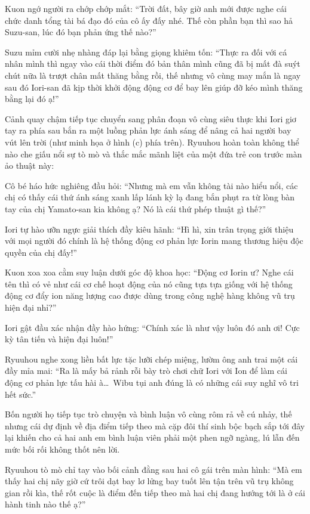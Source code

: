 \documentclass[../main.tex]{subfiles}
\begin{document}
Kuon ngớ người ra chớp chớp mắt: ``Trời đất, bây giờ anh mới được nghe cái chức danh tổng tài bá đạo đó của cô ấy đấy nhé. Thế còn phần bạn thì sao hả Suzu-san, lúc đó bạn phản ứng thế nào?''

Suzu mỉm cười nhẹ nhàng đáp lại bằng giọng khiêm tốn: ``Thực ra đối với cá nhân mình thì ngay vào cái thời điểm đó bản thân mình cũng đã bị mất đà suýt chút nữa là trượt chân mất thăng bằng rồi, thế nhưng vô cùng may mắn là ngay sau đó Iori-san đã kịp thời khởi động động cơ để bay lên giúp đỡ kéo mình thăng bằng lại đó ạ!''

Cảnh quay chậm tiếp tục chuyển sang phân đoạn vô cùng siêu thực khi Iori giơ tay ra phía sau bắn ra một luồng phản lực ánh sáng để nâng cả hai người bay vút lên trời (như minh họa ở hình (c) phía trên). Ryuuhou hoàn toàn không thể nào che giấu nổi sự tò mò và thắc mắc mãnh liệt của một đứa trẻ con trước màn ảo thuật này:

Cô bé háo hức nghiêng đầu hỏi: ``Nhưng mà em vẫn không tài nào hiểu nổi, các chị có thấy cái thứ ánh sáng xanh lấp lánh kỳ lạ đang bắn phụt ra từ lòng bàn tay của chị Yamato-san kia không ạ? Nó là cái thứ phép thuật gì thế?''

Iori tự hào ưỡn ngực giải thích đầy kiêu hãnh: ``Hì hì, xin trân trọng giới thiệu với mọi người đó chính là hệ thống động cơ phản lực Iorin mang thương hiệu độc quyền của chị đấy!''

Kuon xoa xoa cằm suy luận dưới góc độ khoa học: ``Động cơ Iorin ư? Nghe cái tên thì có vẻ như cái cơ chế hoạt động của nó cũng tựa tựa giống với hệ thống động cơ đẩy ion năng lượng cao được dùng trong công nghệ hàng không vũ trụ hiện đại nhỉ?''

Iori gật đầu xác nhận đầy hào hứng: ``Chính xác là như vậy luôn đó anh ơi! Cực kỳ tân tiến và hiện đại luôn!''

Ryuuhou nghe xong liền bất lực tặc lưỡi chép miệng, lườm ông anh trai một cái đầy mỉa mai: ``Ra là mấy bả rảnh rỗi bày trò chơi chữ Iori với Ion để làm cái động cơ phản lực tấu hài à\dots\ Wibu tụi anh đúng là có những cái suy nghĩ vô tri hết sức.''

Bốn người họ tiếp tục trò chuyện và bình luận vô cùng rôm rả về cú nhảy, thế nhưng cái dự định về địa điểm tiếp theo mà cặp đôi thí sinh bộc bạch sắp tới đây lại khiến cho cả hai anh em bình luận viên phải một phen ngỡ ngàng, lú lẫn đến mức bối rối không thốt nên lời.

Ryuuhou tò mò chỉ tay vào bối cảnh đằng sau hai cô gái trên màn hình: ``Mà em thấy hai chị nãy giờ cứ trôi dạt bay lơ lửng bay tuốt lên tận trên vũ trụ không gian rồi kìa, thế rốt cuộc là điểm đến tiếp theo mà hai chị đang hướng tới là ở cái hành tinh nào thế ạ?''
\end{document}
